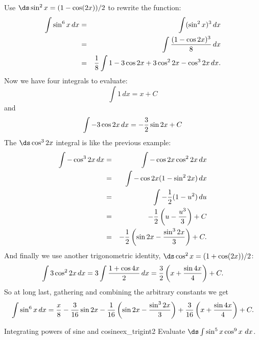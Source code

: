 \begin{solution} 
Use $\ds \sin^2x =(1-\cos(2x))/2$ to
rewrite the function:
\begin{eqnarray*}
  \int \sin^6 x\,dx&=&\int (\sin^2 x)^3\,dx\\
	&=&\int {(1-\cos 2x)^3\over 8}\,dx\\
  &=&{1\over 8}\int 1-3\cos 2x+3\cos^2 2x-\cos^3 2x\,dx.
\end{eqnarray*}
Now we have four integrals to evaluate:
$$\int 1\,dx=x+C$$
and
$$\int -3\cos 2x\,dx = -{3\over 2}\sin 2x+C$$
The $\ds \cos^3 2x$ integral is like the previous example:
\begin{eqnarray*}
  \int -\cos^3 2x\,dx&=&\int -\cos 2x\cos^2 2x\,dx\\
  &=&\int -\cos 2x(1-\sin^2 2x)\,dx\\
  &=&\int -{1\over 2}(1-u^2)\,du\\
  &=&-{1\over 2}\left(u-{u^3\over 3}\right)+C\\
  &=&-{1\over 2}\left(\sin 2x-{\sin^3 2x\over 3}\right)+C.
\end{eqnarray*}
And finally we use another trigonometric identity,
$\ds \cos^2x=(1+\cos(2x))/2$:
$$
  \int 3\cos^2 2x\,dx=3\int {1+\cos 4x\over 2}\,dx=
  {3\over 2}\left(x+{\sin 4x\over 4}\right)+C.
$$
So at long last, gathering and combining the arbitrary constants we get
$$
  \int \sin^6 x\,dx = {x\over8} -{3\over 16}\sin 2x 
  -{1\over 16}\left(\sin 2x-{\sin^3 2x\over 3}\right)
  +{3\over 16}\left(x+{\sin 4x\over 4}\right)+C.
$$\vskip-10pt
\end{solution}


\begin{example}{Integrating powers of sine and cosine}{ex_trigint2}
Evaluate $\ds \int\sin^5x\cos^9x\ dx$.
\end{example}

